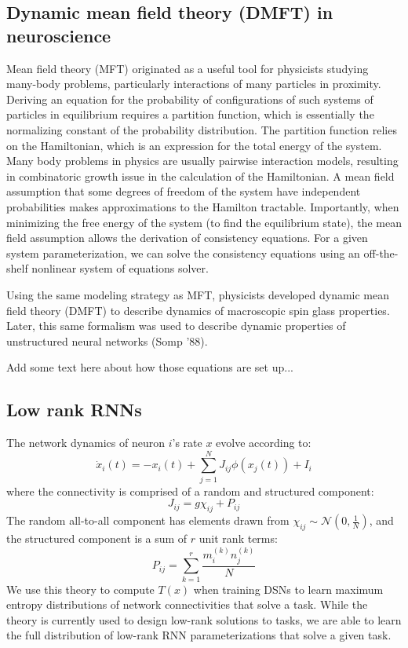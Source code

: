 \documentclass[11pt]{article}
\begin{document}
\subsection{Dynamic mean field theory (DMFT) in neuroscience}
Mean field theory (MFT) originated as a useful tool for physicists studying many-body problems, particularly interactions of many particles in proximity.  Deriving an equation for the probability of configurations of such systems of particles in equilibrium requires a partition function, which is essentially the normalizing constant of the probability distribution.  The partition function relies on the Hamiltonian, which is an expression for the total energy of the system.  Many body problems in physics are usually pairwise interaction models, resulting in  combinatoric growth issue in the calculation of the Hamiltonian.  A mean field assumption that some degrees of freedom of the system have independent probabilities makes approximations to the Hamilton tractable.  Importantly, when minimizing the free energy of the system (to find the equilibrium state), the mean field assumption allows the derivation of consistency equations.  For a given system parameterization, we can solve the consistency equations using an off-the-shelf nonlinear system of equations solver.

Using the same modeling strategy as MFT, physicists developed dynamic mean field theory (DMFT) to describe dynamics of macroscopic spin glass properties. Later, this same formalism was used to describe dynamic properties of unstructured neural networks (Somp ’88).

Add some text here about how those equations are set up...

\subsection{Low rank RNNs}
The network dynamics of neuron $i$'s rate $x$ evolve according to:
\begin{equation}
\dot{x}_i(t) = -x_i(t) + \sum_{j=1}^N J_{ij} \phi(x_j(t)) + I_i 
\end{equation}
where the connectivity is comprised of a random and structured component:
\begin{equation}
J_{ij} = g \chi_{ij} + P_{ij}
\end{equation}
The random all-to-all component has elements drawn from
$\chi_{ij} \sim \mathcal{N}(0, \frac{1}{N})$, and the structured
component is a sum of $r$ unit rank terms:
\begin{equation}
P_{ij} = \sum_{k=1}^r \frac{m_i^{(k)}n_j^{(k)}}{N}
\end{equation}
We use this theory to compute $T(x)$ when training DSNs to learn maximum entropy distributions of network connectivities that solve a task.  While the theory is currently used to design low-rank solutions to tasks, we are able to learn the full distribution of low-rank RNN parameterizations that solve a given task.
\end{document}
